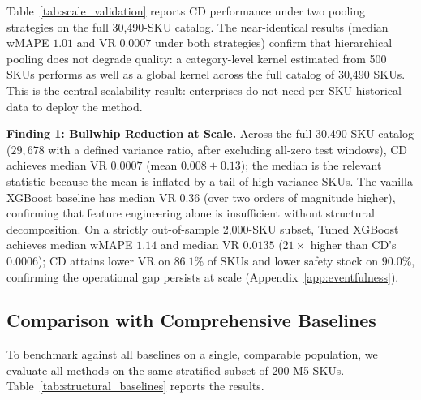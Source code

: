 \documentclass[10pt]{article} %
\theoremstyle{plain}
\theoremstyle{definition}
\begin{document}
Table~\ref{tab:scale_validation} reports CD performance under two pooling strategies on the full 30,490-SKU catalog. The near-identical results (median wMAPE $1.01$ and VR $0.0007$ under both strategies) confirm that hierarchical pooling does not degrade quality: a category-level kernel estimated from 500 SKUs performs as well as a global kernel across the full catalog of 30,490 SKUs. This is the central scalability result: enterprises do not need per-SKU historical data to deploy the method.

\textbf{Finding 1: Bullwhip Reduction at Scale.} Across the full 30,490-SKU catalog ($29{,}678$ with a defined variance ratio, after excluding all-zero test windows), CD achieves median VR $0.0007$ (mean $0.008 \pm 0.13$); the median is the relevant statistic because the mean is inflated by a tail of high-variance SKUs. The vanilla XGBoost baseline has median VR $0.36$ (over two orders of magnitude higher), confirming that feature engineering alone is insufficient without structural decomposition. On a strictly out-of-sample 2{,}000-SKU subset, Tuned XGBoost achieves median wMAPE $1.14$ and median VR $0.0135$ ($21\times$ higher than CD's $0.0006$); CD attains lower VR on $86.1\%$ of SKUs and lower safety stock on $90.0\%$, confirming the operational gap persists at scale (Appendix~\ref{app:eventfulness}).

\subsection{Comparison with Comprehensive Baselines}

To benchmark against all baselines on a single, comparable population, we evaluate all methods on the same stratified subset of 200 M5 SKUs. Table~\ref{tab:structural_baselines} reports the results.
\end{document}
